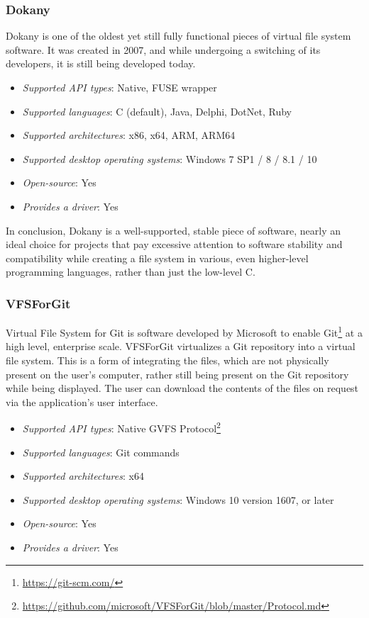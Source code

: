 \subsubsection{Dokany}
Dokany is one of the oldest yet still fully functional pieces of virtual file system software. It was created in 2007, and while undergoing a switching of its developers, it is still being developed today.

\begin{itemize}
    \item \textit{Supported API types}: Native, FUSE wrapper
    \item \textit{Supported languages}: C (default), Java, Delphi, DotNet, Ruby
    \item \textit{Supported architectures}: x86, x64, ARM, ARM64
    \item \textit{Supported desktop operating systems}: Windows 7 SP1 / 8 / 8.1 / 10
    \item \textit{Open-source}: Yes
    \item \textit{Provides a driver}: Yes
\end{itemize}

In conclusion, Dokany is a well-supported, stable piece of software, nearly an ideal choice for projects that pay excessive attention to software stability and compatibility while creating a file system in various, even higher-level programming languages, rather than just the low-level C.\cite{GitDokany}\cite{DokanDevIo}

\subsubsection{VFSForGit}
Virtual File System for Git is software developed by Microsoft to enable Git\footnote{\url{https://git-scm.com/}} at a high level, enterprise scale. VFSForGit virtualizes a Git repository into a virtual file system. This is a form of integrating the files, which are not physically present on the user's computer, rather still being present on the Git repository while being displayed. The user can download the contents of the files on request via the application's user interface. 

\begin{itemize}
    \item \textit{Supported API types}: Native GVFS Protocol\footnote{\url{https://github.com/microsoft/VFSForGit/blob/master/Protocol.md}}
    \item \textit{Supported languages}: Git commands
    \item \textit{Supported architectures}: x64
    \item \textit{Supported desktop operating systems}: Windows 10 version 1607, or later
    \item \textit{Open-source}: Yes
    \item \textit{Provides a driver}: Yes
\end{itemize}

